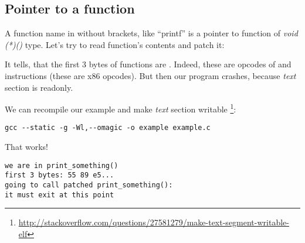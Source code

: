 \subsection{Pointer to a function}

A function name in \CCpp without brackets, like ``printf'' is a pointer to function of \emph{void (*)()} type.
Let's try to read function's contents and patch it:



It tells, that the first 3 bytes of functions are .
Indeed, these are opcodes of  and  instructions (these are x86 opcodes).
But then our program crashes, because \emph{text} section is readonly.

We can recompile our example and make \emph{text} section writable
\footnote{\url{http://stackoverflow.com/questions/27581279/make-text-segment-writable-elf}}:

\begin{lstlisting}
gcc --static -g -Wl,--omagic -o example example.c
\end{lstlisting}

That works!

\begin{lstlisting}
we are in print_something()
first 3 bytes: 55 89 e5...
going to call patched print_something():
it must exit at this point
\end{lstlisting}

